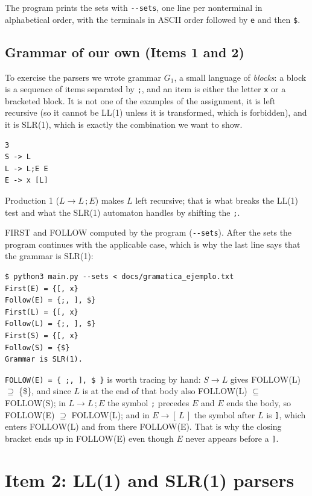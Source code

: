 \documentclass[11pt,letterpaper]{article}
\newcommand{\nt}[1]{\texttt{#1}}
\begin{document}
The program prints the sets with \nt{-{}-sets}, one line per nonterminal in alphabetical order, with
the terminals in ASCII order followed by \nt{e} and then \nt{\$}.

\subsection{Grammar of our own (Items 1 and 2)}

To exercise the parsers we wrote grammar $G_1$, a small language of \emph{blocks}: a block is a
sequence of items separated by \nt{;}, and an item is either the letter \nt{x} or a bracketed block.
It is not one of the examples of the assignment, it is left recursive (so it cannot be LL(1) unless
it is transformed, which is forbidden), and it is SLR(1), which is exactly the combination we want
to show.

\begin{lstlisting}[style=codigo]
3
S -> L
L -> L;E E
E -> x [L]
\end{lstlisting}

Production 1 ($L \to L\,;E$) makes $L$ left recursive; that is what breaks the LL(1) test and what
the SLR(1) automaton handles by shifting the \nt{;}.

FIRST and FOLLOW computed by the program (\nt{-{}-sets}). After the sets the program continues
with the applicable case, which is why the last line says that the grammar is SLR(1):

\begin{lstlisting}[style=consola]
$ python3 main.py --sets < docs/gramatica_ejemplo.txt
First(E) = {[, x}
Follow(E) = {;, ], $}
First(L) = {[, x}
Follow(L) = {;, ], $}
First(S) = {[, x}
Follow(S) = {$}
Grammar is SLR(1).
\end{lstlisting}

\nt{FOLLOW(E) = \{ ;, ], \$ \}} is worth tracing by hand: $S \to L$ gives FOLLOW(L) $\supseteq$
\{\$\}, and since $L$ is at the end of that body also FOLLOW(L) $\subseteq$ FOLLOW(S); in $L \to
L\,;E$ the symbol \nt{;} precedes $E$ and $E$ ends the body, so FOLLOW(E) $\supseteq$ FOLLOW(L); and
in $E \to [\,L\,]$ the symbol after $L$ is \nt{]}, which enters FOLLOW(L) and from there FOLLOW(E).
That is why the closing bracket ends up in FOLLOW(E) even though $E$ never appears before a
\nt{]}.

\section{Item 2: LL(1) and SLR(1) parsers}
\end{document}
